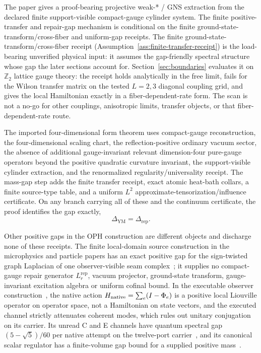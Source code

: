 \documentclass[11pt]{article}
\numberwithin{equation}{section}
\theoremstyle{remark}
\newcommand{\YM}{\mathrm{YM}}
\newcommand{\Rep}{\mathrm{rep}}
\begin{document}
The paper gives a proof-bearing projective weak-* / GNS extraction from the
declared finite support-visible compact-gauge cylinder system. The finite
positive-transfer and repair-gap mechanism is conditional on the finite
ground-state-transform/cross-fiber and uniform-gap receipts. The finite
ground-state-transform/cross-fiber receipt
(Assumption~\ref{ass:finite-transfer-receipt}) is the load-bearing
unverified physical input: it assumes the gap-friendly spectral structure
whose gap the later sections account for. Section~\ref{sec:boundaries}
evaluates it on \(\mathbb Z_2\) lattice gauge theory: the receipt holds
analytically in the free limit, fails for the Wilson transfer matrix on the
tested \(L=2,3\) diagonal coupling grid, and gives the local Hamiltonian
exactly in a fiber-dependent-rate form. The scan is not a no-go for other
couplings, anisotropic limits, transfer objects, or that
fiber-dependent-rate route.

The imported four-dimensional form theorem uses compact-gauge
reconstruction, the four-dimensional scaling chart, the reflection-positive
ordinary vacuum sector, the absence of additional gauge-invariant relevant
dimension-four pure-gauge operators beyond the positive quadratic curvature
invariant, the support-visible cylinder extraction, and the renormalized
regularity/universality receipt. The mass-gap step adds the finite transfer
receipt, exact atomic heat-bath collars, a finite source-type table, and a
uniform \(L^2\) approximate-tensorization/influence certificate. On any
branch carrying all of these and the continuum certificate, the proof
identifies the gap exactly,
\[
\Delta_{\YM}=\Delta_{\mathrm{rep}}.
\]

Other positive gaps in the OPH construction are different objects and
discharge none of these receipts. The finite local-domain source
construction in the microphysics and particle papers has an exact positive
gap for the sign-twisted graph Laplacian of one observer-visible seam
complex~\cite{oph5,ophfpe}; it supplies no compact-gauge repair generator
\(L^{\Rep}_r\), vacuum projector, ground-state transform, gauge-invariant
excitation algebra or uniform cofinal bound. In the executable observer
construction~\cite{ophmodel}, the native action
\(H_{\rm native}=\sum_e(I-\Phi_e)\) is a positive local Liouville operator on
operator space, not a Hamiltonian on state vectors, and the executed channel
strictly attenuates coherent modes, which rules out unitary conjugation on
its carrier. Its unread C and E channels have quantum spectral gap
\((5-\sqrt5)/60\) per native attempt on the twelve-port
carrier~\cite{ophnativeaction,ophmixing}, and its canonical scalar regulator
has a finite-volume gap bound for a supplied positive
mass~\cite{ophrelscalar}.
\end{document}
